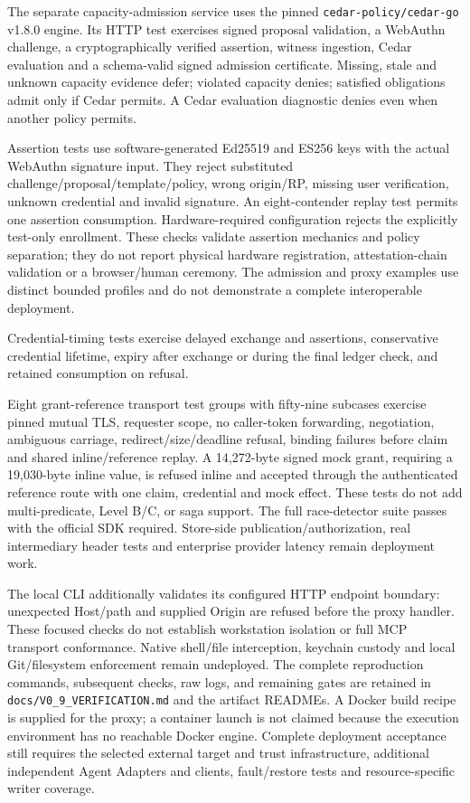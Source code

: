 The separate capacity-admission service uses the pinned \texttt{cedar-policy/cedar-go} v1.8.0 engine. Its HTTP test exercises signed proposal validation, a WebAuthn challenge, a cryptographically verified assertion, witness ingestion, Cedar evaluation and a schema-valid signed admission certificate. Missing, stale and unknown capacity evidence defer; violated capacity denies; satisfied obligations admit only if Cedar permits. A Cedar evaluation diagnostic denies even when another policy permits.

Assertion tests use software-generated Ed25519 and ES256 keys with the actual WebAuthn signature input. They reject substituted challenge/proposal/template/policy, wrong origin/RP, missing user verification, unknown credential and invalid signature. An eight-contender replay test permits one assertion consumption. Hardware-required configuration rejects the explicitly test-only enrollment. These checks validate assertion mechanics and policy separation; they do not report physical hardware registration, attestation-chain validation or a browser/human ceremony. The admission and proxy examples use distinct bounded profiles and do not demonstrate a complete interoperable deployment.

Credential-timing tests exercise delayed exchange and assertions, conservative credential lifetime, expiry after exchange or during the final ledger check, and retained consumption on refusal.

Eight grant-reference transport test groups with fifty-nine subcases exercise pinned mutual TLS, requester scope, no caller-token forwarding, negotiation, ambiguous carriage, redirect/size/deadline refusal, binding failures before claim and shared inline/reference replay. A 14,272-byte signed mock grant, requiring a 19,030-byte inline value, is refused inline and accepted through the authenticated reference route with one claim, credential and mock effect. These tests do not add multi-predicate, Level B/C, or saga support. The full race-detector suite passes with the official SDK required. Store-side publication/authorization, real intermediary header tests and enterprise provider latency remain deployment work.

The local CLI additionally validates its configured HTTP endpoint boundary: unexpected Host/path and supplied Origin are refused before the proxy handler. These focused checks do not establish workstation isolation or full MCP transport conformance. Native shell/file interception, keychain custody and local Git/filesystem enforcement remain undeployed. The complete reproduction commands, subsequent checks, raw logs, and remaining gates are retained in \texttt{docs/V0\_9\_VERIFICATION.md} and the artifact READMEs. A Docker build recipe is supplied for the proxy; a container launch is not claimed because the execution environment has no reachable Docker engine. Complete deployment acceptance still requires the selected external target and trust infrastructure, additional independent Agent Adapters and clients, fault/restore tests and resource-specific writer coverage.

